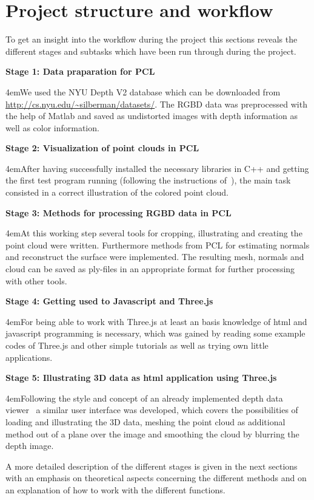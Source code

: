 \documentclass[paper=a4,11pt,bibliography=totoc]{scrartcl}
\begin{document}
\section{Project structure and workflow}
\label{sec:projectstructure}
%
To get an insight into the workflow during the project this sections reveals the different stages and subtasks which have been run through during the project.

\textbf{Stage 1: Data praparation for PCL}
\begin{center}
\leftskip4em\small We used the NYU Depth V2 database which can be downloaded from \url{http://cs.nyu.edu/~silberman/datasets/}. The RGBD data was preprocessed with the help of Matlab and saved as undistorted images with depth information as well as color information.
\end{center}
%
\textbf{Stage 2: Visualization of point clouds in PCL}
\begin{center}
\leftskip4em\small After having successfully installed the necessary libraries in C++ and getting the first test program running (following the instructions of~\cite{peris}), the main task consisted in a correct illustration of the colored point cloud.
\end{center}
%
\textbf{Stage 3: Methods for processing RGBD data in PCL}
\begin{center}
\leftskip4em\small At this working step several tools for cropping, illustrating and creating the point cloud were written. Furthermore methods from PCL for estimating normals and reconstruct the surface were implemented. The resulting mesh, normals and cloud can be saved as ply-files in an appropriate format for further processing with other tools.
\end{center}
%
\textbf{Stage 4: Getting used to Javascript and Three.js}
\begin{center}
\leftskip4em\small For being able to work with Three.js at least an basis knowledge of html and javascript programming is necessary, which was gained by reading some example codes of Three.js and other simple tutorials as well as trying own little applications.
\end{center}
%
\textbf{Stage 5: Illustrating 3D data as html application using Three.js}
\begin{center}
\leftskip4em\small Following the style and concept of an already implemented depth data viewer~\cite{depthplayer} a similar user interface was developed, which covers the possibilities of loading and illustrating the 3D data, meshing the point cloud as additional method out of a plane over the image and smoothing the cloud by blurring the depth image.
\end{center}
%
A more detailed description of the different stages is given in the next sections with an emphasis on theoretical aspects concerning the different methods and on an explanation of how to work with the different functions.
%
\end{document}
